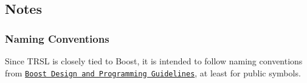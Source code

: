 \hypertarget{group__notes}{
\subsection{Notes}
\label{group__notes}
}
\hypertarget{group__notes_notes_naming_conventions}{}\subsubsection{Naming Conventions}\label{group__notes_notes_naming_conventions}
Since TRSL is closely tied to Boost, it is intended to follow naming conventions from \href{http://www.boost.org/more/lib_guide.htm#Design_and_Programming}{\tt Boost Design and Programming Guidelines}, at least for public symbols. 
